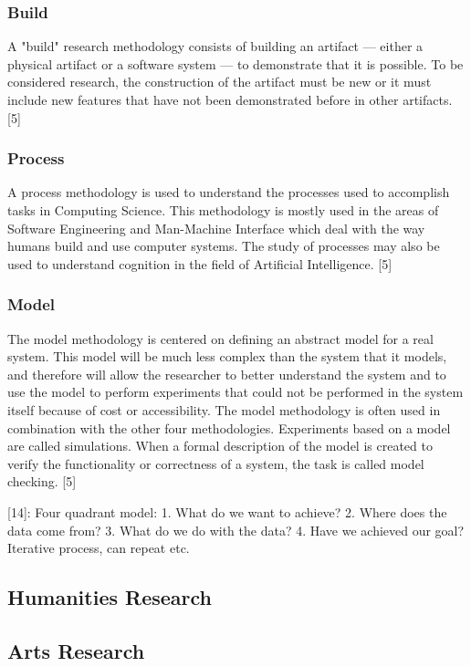 \subsubsection{Build}

A "build" research methodology consists of building an artifact — either a physical artifact or a software system — to demonstrate that it is possible. To be considered research, the construction of the artifact must be new or it must include new features that have not been demonstrated before in other artifacts. [5]

\subsubsection{Process}

A process methodology is used to understand the processes used to accomplish tasks in Computing Science. This methodology is mostly used in the areas of Software Engineering and Man-Machine Interface which deal with the way humans build and use computer systems. The study of processes may also be used to understand cognition in the field of Artificial Intelligence. [5]

\subsubsection{Model}

The model methodology is centered on defining an abstract model for a real system. This model will be much less complex than the system that it models, and therefore will allow the researcher to better understand the system and to use the model to perform experiments that could not be performed in the system itself because of cost or accessibility. The model methodology is often used in combination with the other four methodologies. Experiments based on a model are called simulations. When a formal description of the model is created to verify the functionality or correctness of a system, the task is called model checking. [5]

[14]:
Four quadrant model:
1.	What do we want to achieve?
2.	Where does the data come from?
3.	What do we do with the data?
4.	Have we achieved our goal?
Iterative process, can repeat etc.


\subsection{Humanities Research}

\subsection{Arts Research}

